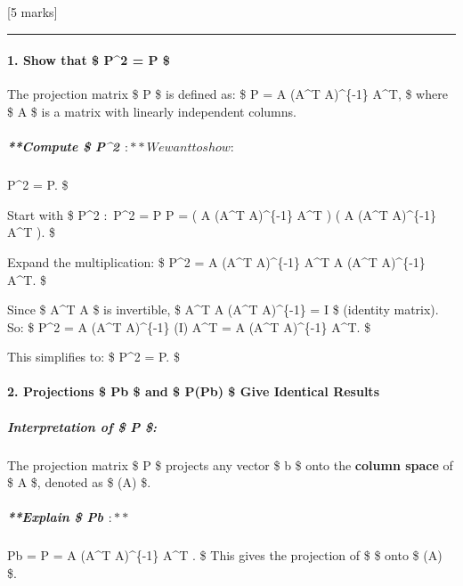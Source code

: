 \documentclass[11pt]{article}
\begin{document}
{[}5 marks{]}

    \begin{center}\rule{0.5\linewidth}{0.5pt}\end{center}

\paragraph{\texorpdfstring{\textbf{1. Show that \$ P\^{}2 = P
\$}}{1. Show that \$ P\^{}2 = P \$}}\label{show-that-p2-p}

The projection matrix \$ P \$ is defined as: \$ P = A (A\^{}T
A)\^{}\{-1\} A\^{}T, \$ where \$ A \$ is a matrix with linearly
independent columns.

\subparagraph{\texorpdfstring{**Compute \$ P\^{}2 \(:**
We want to show:\)}{**Compute \$ P\^{}2 :**
We want to show:}}\label{compute-p2-we-want-to-show}

P\^{}2 = P. \$

Start with \$ P\^{}2 \(:\) P\^{}2 = P \cdot P = \left( A (A\^{}T
A)\^{}\{-1\} A\^{}T \right) \cdot \left( A (A\^{}T A)\^{}\{-1\} A\^{}T
\right). \$

Expand the multiplication: \$ P\^{}2 = A (A\^{}T A)\^{}\{-1\} A\^{}T A
(A\^{}T A)\^{}\{-1\} A\^{}T. \$

Since \$ A\^{}T A \$ is invertible, \$ A\^{}T A (A\^{}T A)\^{}\{-1\} = I
\$ (identity matrix). So: \$ P\^{}2 = A (A\^{}T A)\^{}\{-1\} (I) A\^{}T
= A (A\^{}T A)\^{}\{-1\} A\^{}T. \$

This simplifies to: \$ P\^{}2 = P. \$

\paragraph{\texorpdfstring{\textbf{2. Projections \$ Pb \$ and \$ P(Pb)
\$ Give Identical
Results}}{2. Projections \$ Pb \$ and \$ P(Pb) \$ Give Identical Results}}\label{projections-pb-and-ppb-give-identical-results}

\subparagraph{\texorpdfstring{\textbf{Interpretation of \$ P
\$:}}{Interpretation of \$ P \$:}}\label{interpretation-of-p}

The projection matrix \$ P \$ projects any vector \$ b \$ onto the
\textbf{column space} of \$ A \$, denoted as \$ (A) \$.

\subparagraph{\texorpdfstring{**Explain \$ Pb
\(:**\)}{**Explain \$ Pb :**}}\label{explain-pb}

Pb = P  = A (A\^{}T A)\^{}\{-1\} A\^{}T . \$ This
gives the projection of \$  \$ onto \$ (A) \$.
\end{document}
